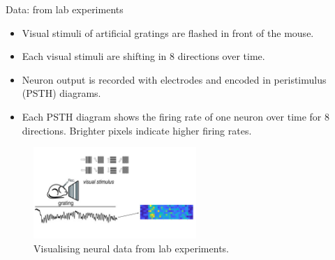 \documentclass[xcolor={dvipsnames,svgnames}]{beamer}
\begin{document}

\begin{frame}{Data: from lab experiments}
    \begin{itemize}
        \item Visual stimuli of artificial gratings are flashed in front of the mouse.
        \item Each visual stimuli are shifting in 8 directions over time.
        \item Neuron output is recorded with electrodes and encoded in peristimulus (PSTH) diagrams.
        \item Each PSTH diagram shows the firing rate of one neuron over time for 8 directions. Brighter pixels indicate higher firing rates.
    \end{itemize} 

   \begin{figure}
        \centering
            \includegraphics[width=0.55\textwidth]{presentation/Slide5.jpg}
            \caption{Visualising neural data from lab experiments.}
    \end{figure}
\end{frame}
\end{document}
